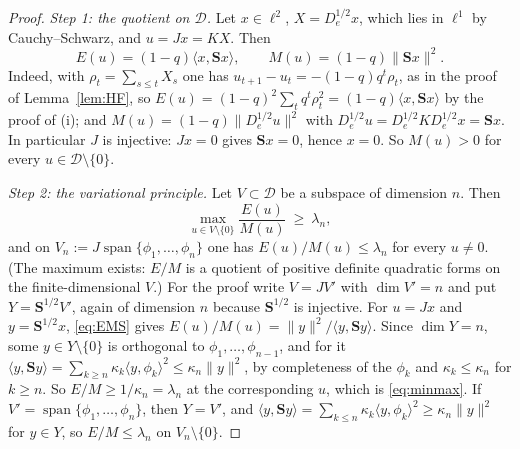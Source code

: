\documentclass[11pt]{article}
\theoremstyle{plain}
\theoremstyle{definition}
\theoremstyle{remark}
\begin{document}
\begin{proof}
\emph{Step 1: the quotient on $\mathcal D$.} Let $x\in\ell^2$, $X=D_e^{1/2}x$, which lies in
$\ell^1$ by Cauchy--Schwarz, and $u=Jx=KX$. Then
\begin{equation}\label{eq:EMS}
   E(u)=(1-q)\langle x,\mathbf Sx\rangle,\qquad M(u)=(1-q)\|\mathbf Sx\|^2 .
\end{equation}
Indeed, with $\rho_t=\sum_{s\le t}X_s$ one has $u_{t+1}-u_t=-(1-q)q^t\rho_t$, as in the proof of
Lemma~\ref{lem:HF}, so $E(u)=(1-q)^2\sum_tq^t\rho_t^2=(1-q)\langle x,\mathbf Sx\rangle$ by the
proof of {\cite[Theorem ``the travel determinant'', \textup{thm:fredholm}]{Bonfioli2026bA}}\textup{(i)};
and $M(u)=(1-q)\|D_e^{1/2}u\|^2$ with $D_e^{1/2}u=D_e^{1/2}KD_e^{1/2}x=\mathbf Sx$. In particular
$J$ is injective: $Jx=0$ gives $\mathbf Sx=0$, hence $x=0$. So $M(u)>0$ for every
$u\in\mathcal D\setminus\{0\}$.

\emph{Step 2: the variational principle.} Let $V\subset\mathcal D$ be a subspace of dimension $n$.
Then
\begin{equation}\label{eq:minmax}
   \max_{u\in V\setminus\{0\}}\frac{E(u)}{M(u)}\ \ge\ \lambda_n ,
\end{equation}
and on $V_n:=J\operatorname{span}\{\phi_1,\dots,\phi_n\}$ one has $E(u)/M(u)\le\lambda_n$ for every
$u\ne0$. (The maximum exists: $E/M$ is a quotient of positive definite quadratic forms on the
finite-dimensional $V$.) For the proof write $V=JV'$ with $\dim V'=n$ and put
$Y=\mathbf S^{1/2}V'$, again of dimension $n$ because $\mathbf S^{1/2}$ is injective. For $u=Jx$
and $y=\mathbf S^{1/2}x$, \eqref{eq:EMS} gives $E(u)/M(u)=\|y\|^2/\langle y,\mathbf Sy\rangle$.
Since $\dim Y=n$, some $y\in Y\setminus\{0\}$ is orthogonal to $\phi_1,\dots,\phi_{n-1}$, and for it
$\langle y,\mathbf Sy\rangle=\sum_{k\ge n}\kappa_k\langle y,\phi_k\rangle^2\le\kappa_n\|y\|^2$,
by completeness of the $\phi_k$ and $\kappa_k\le\kappa_n$ for $k\ge n$. So $E/M\ge1/\kappa_n=\lambda_n$
at the corresponding $u$, which is \eqref{eq:minmax}. If $V'=\operatorname{span}\{\phi_1,\dots,\phi_n\}$,
then $Y=V'$, and $\langle y,\mathbf Sy\rangle=\sum_{k\le n}\kappa_k\langle y,\phi_k\rangle^2
\ge\kappa_n\|y\|^2$ for $y\in Y$, so $E/M\le\lambda_n$ on $V_n\setminus\{0\}$.


\end{proof}
\end{document}
